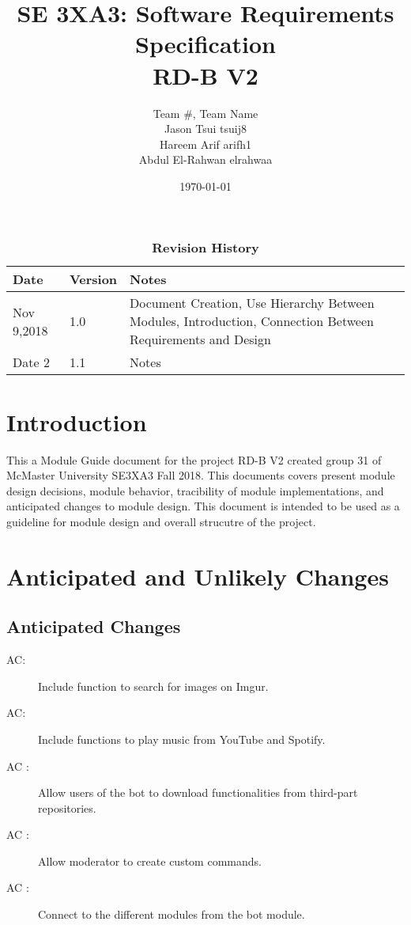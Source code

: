 \documentclass[12pt, titlepage]{article}
\title{SE 3XA3: Software Requirements Specification\\RD-B V2}
\author{Team \#, Team Name
		\\ Jason Tsui tsuij8
		\\ Hareem Arif arifh1
		\\ Abdul El-Rahwan elrahwaa
}
\date{\today}
\newcounter{acnum}
\newcommand{\actheacnum}{AC\theacnum}
\begin{document}
\maketitle

\tableofcontents
\listoftables
\listoffigures

\begin{table}[bp]
\caption{\bf Revision History}
\begin{tabularx}{\textwidth}{p{3cm}p{2cm}X}
\toprule {\bf Date} & {\bf Version} & {\bf Notes}\\
\midrule
Nov 9,2018 & 1.0 & Document Creation, Use Hierarchy Between Modules, Introduction, Connection Between Requirements and Design\\
Date 2 & 1.1 & Notes\\
\bottomrule
\end{tabularx}
\end{table}

\newpage


\section{Introduction}

This a Module Guide document for the project RD-B V2 created group 31 of McMaster University SE3XA3 Fall 2018. This documents covers present module design decisions, module behavior, tracibility of module implementations, and anticipated changes to module design. This document is intended to be used as a guideline for module design and overall strucutre of the project. 

\section{Anticipated and Unlikely Changes} \label{SecChange}


\subsection{Anticipated Changes} \label{SecAchange}


\begin{description}
\item[ \actheacnum \label{acImage}:] Include function to search for images on Imgur.
\item[ \actheacnum \label{acAudio}:] Include functions to play music from YouTube and Spotify.
\item[ \actheacnum
\label{acDownloader}:] Allow users of the bot to download functionalities from third-part repositories.
\item[ \actheacnum
\label{acCustomcom}:] Allow moderator to create custom commands.
\item[ \actheacnum
\label{acBot}:] Connect to the different modules from the bot module.
\end{description}
\end{document}
